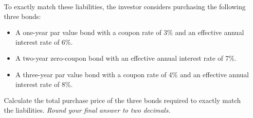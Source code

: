 \documentclass[11pt]{article}
\begin{document}
To exactly match these liabilities, the investor considers purchasing the following three bonds:

\begin{itemize}[leftmargin=*]
    \item[(i)] A one-year par value bond with a coupon rate of 3\% and an effective annual interest rate of 6\%.
    
    \item[(ii)] A two-year zero-coupon bond with an effective annual interest rate of 7\%.
    
    \item[(iii)] A three-year par value bond with a coupon rate of 4\% and an effective annual interest rate of 8\%.
\end{itemize}

Calculate the total purchase price of the three bonds required to exactly match the liabilities. \textit{Round your final answer to two decimals.}
\end{document}
